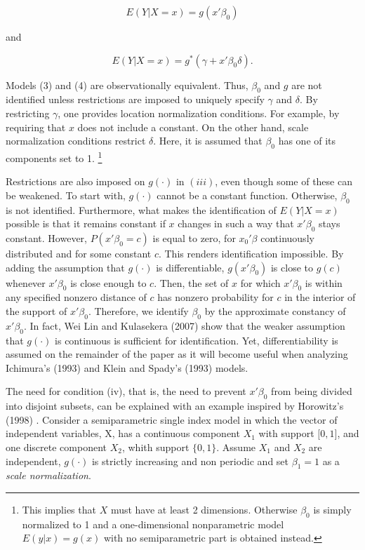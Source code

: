 \documentclass[a4paper]{article}
\begin{document}
\begin{equation}
E(Y|X = x) = g(x'\beta_0)
\end{equation}

and

\begin{equation}
E(Y|X = x) = g^*(\gamma + x'\beta_0\delta).
\end{equation}

Models (3) and (4) are observationally equivalent. Thus, $\beta_0$ and $g$ are not identified unless restrictions are imposed to uniquely specify $\gamma$ and $\delta$. By restricting $\gamma$, one provides location normalization conditions. For example, by requiring that $x$ does not include a constant. On the other hand, scale normalization conditions restrict $\delta$. Here, it is assumed that $\beta_0$ has one of its components set to 1. \footnote{This implies that $X$ must have at least 2 dimensions. Otherwise $\beta_0$ is simply normalized to 1 and a one-dimensional nonparametric model $E(y|x) = g(x)$ with no semiparametric part is obtained instead.}

Restrictions are also imposed on $g(\cdot)$ in $(iii)$, even though some of these can be weakened. To start with, $g(\cdot)$ cannot be a constant function. Otherwise, $\beta_0$ is not identified. Furthermore, what makes the identification of $E(Y|X = x)$ possible is that it remains constant if $x$ changes in such a way that $x'\beta_0$ stays constant. However, $P(x'\beta_0 = c)$ is equal to zero, for $x_0'\beta$ continuously distributed and for some constant $c$. This renders identification impossible. By adding the assumption that $g(\cdot)$ is differentiable, $g(x'\beta_0)$ is close to $g(c)$ whenever $x'\beta_0$ is close enough to $c$. Then, the set of $x$ for which $x'\beta_0$ is within any specified nonzero distance of $c$ has nonzero probability for $c$ in the interior of the support of $x'\beta_0$. Therefore, we identify $\beta_0$ by the approximate constancy of $x'\beta_0$. In fact, Wei Lin and Kulasekera (2007) \cite{[14]} show that the weaker assumption that $g(\cdot)$ is continuous is sufficient for identification. Yet, differentiability is assumed on the remainder of the paper as it will become useful when analyzing Ichimura's (1993) \cite{[6]} and Klein and Spady's (1993) \cite{[12]} models.

The need for condition (iv), that is,  the need to prevent $x'\beta_0$  from being divided into disjoint subsets, can be explained with an example inspired by Horowitz's (1998) \cite{[13]}. Consider a semiparametric single index model in which the vector of independent variables, X, has a continuous component $X_1$ with support $\big[0,1\big]$, and one discrete component $X_2$, whith support $\{0,1\}$. Assume $X_1$ and $X_2$ are independent, $g(\cdot)$ is strictly increasing and non periodic and set $\beta_1 = 1$ as a \textit{scale normalization}. 
\end{document}
